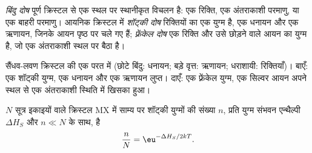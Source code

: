 \begin{definition}[बिंदु दोष]\label{def:b3:solid-state:defects}
\emph{बिंदु दोष} पूर्ण क्रिस्टल से एक स्थल पर
स्थानीकृत विचलन है: एक रिक्ति, एक अंतराकाशी परमाणु, या एक बाहरी
परमाणु। आयनिक क्रिस्टल में \emph{शॉट्की दोष}
रिक्तियों का एक युग्म है, एक धनायन और एक ऋणायन, जिनके आयन
पृष्ठ पर चले गए हैं; \emph{फ़्रेंकेल दोष} एक
रिक्ति और उसे छोड़ने वाले आयन का युग्म है, जो एक अंतराकाशी स्थल पर बैठा है।
\end{definition}

\begin{omfigure}

{\small सैंधव-लवण क्रिस्टल की एक परत में  (छोटे बिंदु: धनायन;
बड़े वृत्त: ऋणायन; धराशायी: रिक्तियाँ)। बाएँ: एक शॉट्की युग्म, एक धनायन
और एक ऋणायन लुप्त। दाएँ: एक फ़्रेंकेल युग्म, एक सिल्वर आयन अपने स्थल से
एक अंतराकाशी स्थिति में खिसका हुआ।}
\end{omfigure}

\begin{theorem}[शॉट्की दोषों की साम्य सांद्रता]\label{thm:b3:solid-state:schottky}
$N$ सूत्र इकाइयों वाले क्रिस्टल MX में साम्य पर शॉट्की युग्मों की संख्या $n$,
प्रति युग्म संभवन एन्थैल्पी $\Delta H_S$ और $n \ll N$ के साथ, है
\[
  \frac{n}{N} = \eu^{-\Delta H_S/2kT}.
\]
\end{theorem}

